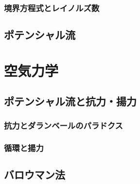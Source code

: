 \documentclass[uplatex,dvipdfmx,a4j,11pt]{jsreport}
\newcommand{\e}{\mathbf{e}} %
\newcommand{\diff}{\mathrm{d}} %
\numberwithin{equation}{chapter}
\begin{document}



\subsection{境界方程式とレイノルズ数}

\section{ポテンシャル流}

\chapter{空気力学}

\section{ポテンシャル流と抗力・揚力}
\subsection{抗力とダランベールのパラドクス}

\subsection{循環と揚力}

\section{バロウマン法}
\end{document}
